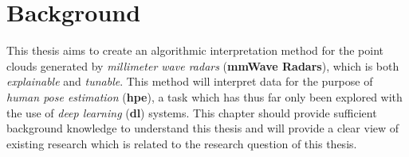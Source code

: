 \chapter{Background}
\label{chapter: background}

This thesis aims to create an algorithmic interpretation method for the point clouds generated by \textit{millimeter wave radars} (\textbf{mmWave Radars}), which is both \textit{explainable} and \textit{tunable}.
This method will interpret data for the purpose of \textit{human pose estimation} (\textbf{hpe}), a task which has thus far only been explored with the use of \textit{deep learning} (\textbf{dl}) systems.
This chapter should provide sufficient background knowledge to understand this thesis and will provide a clear view of existing research which is related to the research question of this thesis.










